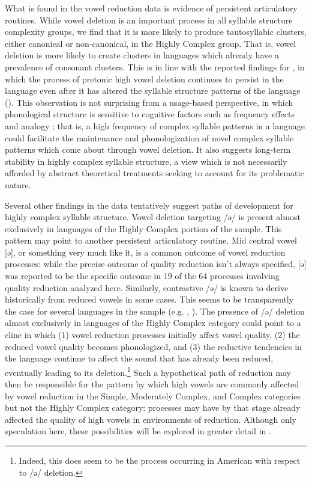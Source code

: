   What is found in the vowel reduction data is evidence of persistent articulatory routines. While vowel deletion is an important process in all syllable structure complexity groups, we find that it is more likely to produce tautosyllabic clusters, either canonical or non-canonical, in the Highly Complex group. That is, vowel deletion is more likely to create clusters in languages which already have a prevalence of consonant clusters. This is in line with the reported findings for , in which the process of pretonic high vowel deletion continues to persist in the language even after it has altered the syllable structure patterns of the language (\citealt{ChitoranBabaliyeva2007}). This observation is not surprising from a usage-based perspective, in which phonological structure is sensitive to cognitive factors such as frequency effects and analogy \citep{Bybee2001}; that is, a high frequency of complex syllable patterns in a language could facilitate the maintenance and phonologization of novel complex syllable patterns which come about through vowel deletion. It also suggests long-term stability in highly complex syllable structure, a view which is not necessarily afforded by abstract theoretical treatments seeking to account for its problematic nature.

  Several other findings in the data tentatively suggest paths of development for highly complex syllable structure. Vowel deletion targeting /ə/ is present almost exclusively in languages of the Highly Complex portion of the sample. This pattern may point to another persistent articulatory routine. Mid central vowel [ə], or something very much like it, is a common outcome of vowel reduction processes: while the precise outcome of quality reduction isn’t always specified, [ə] was reported to be the specific outcome in 19 of the 64 processes involving quality reduction analyzed here. Similarly, contrastive /ə/ is known to derive historically from reduced vowels in some cases. This seems to be transparently the case for several languages in the sample (e.g. , \citealt{Alves2000}). The presence of /ə/ deletion almost exclusively in languages of the Highly Complex category could point to a cline in which 
  (1) vowel reduction processes initially affect vowel quality, 
  (2) the reduced vowel quality becomes phonologized, and 
  (3) the reductive tendencies in the language continue to affect the sound that has already been reduced, eventually leading to its deletion.\footnote{{Indeed, this does seem to be the process occurring in American  with respect to /ə/ deletion.}} Such a hypothetical path of reduction may then be responsible for the pattern by which high vowels are commonly affected by vowel reduction in the Simple, Moderately Complex, and Complex categories but not the Highly Complex category: processes may have by that stage already affected the quality of high vowels in environments of reduction. Although only speculation here, these possibilities will be explored in greater detail in .

